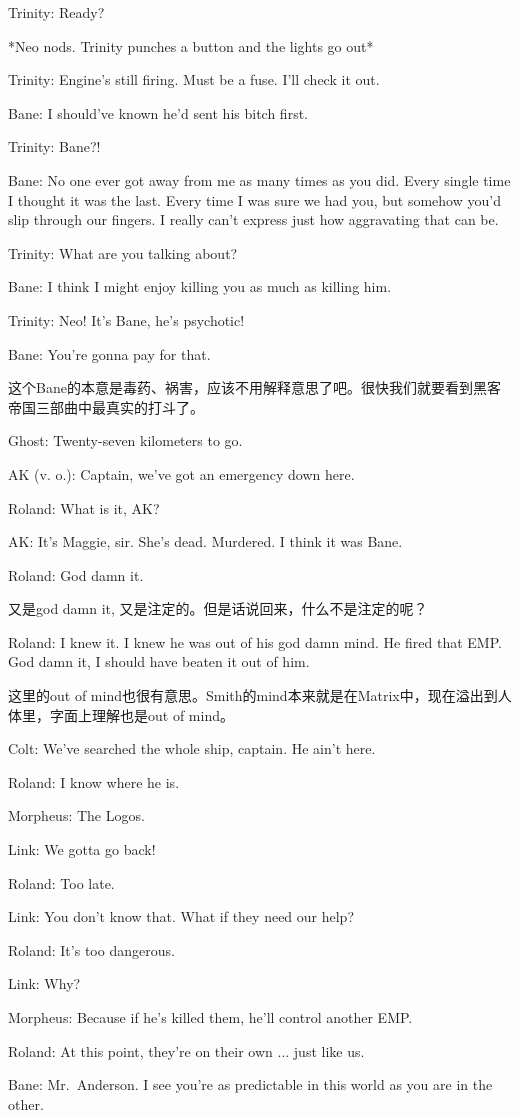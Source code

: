 \documentclass[UTF8]{ctexart}
\newenvironment{myquote}{\color{green} \setlength{\leftskip}{6em} \setlength{\rightskip}{4em} \setlength{\parindent}{-2em}}{\par}
\begin{document}
\begin{myquote}
Trinity: Ready?

*Neo nods. Trinity punches a button and the lights go out*

Trinity: Engine's still firing. Must be a fuse. I'll check it out.

Bane: I should've known he'd sent his bitch first.

Trinity: Bane?!

Bane: No one ever got away from me as many times as you did. Every single time I thought it was the last. Every time I was sure we had you, but somehow you'd slip through our fingers. I really can't express just how aggravating that can be.

Trinity: What are you talking about?

Bane: I think I might enjoy killing you as much as killing him.

Trinity: Neo! It's Bane, he's psychotic!

Bane: You're gonna pay for that.
\end{myquote}

这个Bane的本意是毒药、祸害，应该不用解释意思了吧。很快我们就要看到黑客帝国三部曲中最真实的打斗了。

\begin{myquote}
Ghost: Twenty-seven kilometers to go.

AK (v. o.): Captain, we've got an emergency down here.

Roland: What is it, AK?

AK: It's Maggie, sir. She's dead. Murdered. I think it was Bane.

Roland: God damn it.
\end{myquote}

又是god damn it, 又是注定的。但是话说回来，什么不是注定的呢？

\begin{myquote}
Roland: I knew it. I knew he was out of his god damn mind. He fired that EMP. God damn it, I should have beaten it out of him.
\end{myquote}

这里的out of mind也很有意思。Smith的mind本来就是在Matrix中，现在溢出到人体里，字面上理解也是out of mind。

\begin{myquote}
Colt: We've searched the whole ship, captain. He ain't here.

Roland: I know where he is.

Morpheus: The Logos.

Link: We gotta go back!

Roland: Too late.

Link: You don't know that. What if they need our help?

Roland: It's too dangerous.

Link: Why?

Morpheus: Because if he's killed them, he'll control another EMP.

Roland: At this point, they're on their own ... just like us.

Bane: Mr.~Anderson. I see you're as predictable in this world as you are in the other.
\end{myquote}
\end{document}
